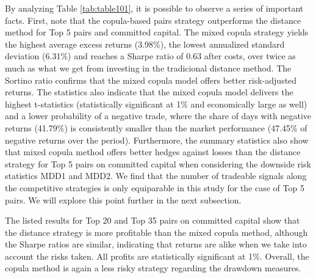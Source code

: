 By analyzing Table \ref{tab:table101}, it is possible to observe a series of important facts. First, note that the copula-based pairs strategy outperforms the distance method for Top 5 pairs and committed capital. The mixed copula strategy yields the highest average excess returns (3.98\%), the lowest annualized standard deviation (6.31\%) and reaches a Sharpe ratio of 0.63 after costs, over twice as much as what we get from investing in the tradicional distance method. The Sortino ratio confirms that the mixed copula model offers better risk-adjusted returns. The statistics also indicate that the mixed copula model delivers the highest t-statistics (statistically significant at 1\% and economically large as well) and a lower probability of a negative trade, where the share of days with negative returns (41.79\%) is consistently smaller than the market performance (47.45\% of negative returns over the period). Furthermore, the summary statistics also show that mixed copula method offers better hedges against losses than the distance strategy for Top 5 pairs on committed capital when considering the downside risk statistics MDD1 and MDD2. We find that the number of tradeable signals along the competitive strategies is only equiparable in this study for the case of Top 5 pairs. We will explore this point further in the next subsection.

 The listed results for Top 20 and Top 35 pairs on committed capital show that the distance strategy is more profitable than the mixed copula method, although the Sharpe ratios are similar, indicating that returns are alike when we take into account the risks taken. All profits are statistically significant at 1\%. Overall, the copula method is again a less risky strategy regarding the drawdown measures.


